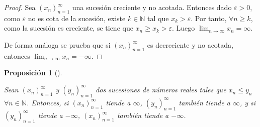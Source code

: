 \documentclass[
  a4paper,
]{scrreport}
\theoremstyle{definition}
\theoremstyle{plain}
\theoremstyle{definition}
\theoremstyle{plain}
\theoremstyle{plain}
\newtheorem{proposition}{Proposición}[chapter]
\theoremstyle{remark}
\begin{document}
\begin{tcolorbox}[enhanced jigsaw, breakable, arc=.35mm, colbacktitle=quarto-callout-note-color!10!white, toptitle=1mm, opacityback=0, colframe=quarto-callout-note-color-frame, colback=white, left=2mm, bottomrule=.15mm, opacitybacktitle=0.6, title=\textcolor{quarto-callout-note-color}{\faInfo}\hspace{0.5em}{Demostración}, toprule=.15mm, titlerule=0mm, coltitle=black, rightrule=.15mm, bottomtitle=1mm, leftrule=.75mm]

\begin{proof}

Sea \((x_n)_{n=1}^\infty\) una sucesión creciente y no acotada. Entonces
dado \(\varepsilon>0\), como \(\varepsilon\) no es cota de la sucesión,
existe \(k\in\mathbb{N}\) tal que \(x_k>\varepsilon\). Por tanto,
\(\forall n\geq k\), como la sucesión es creciente, se tiene que
\(x_n\geq x_k>\varepsilon\). Luego \(\lim_{n\to\infty}x_n=\infty\).

De forma análoga se prueba que si \((x_n)_{n=1}^\infty\) es decreciente
y no acotada, entonces \(\lim_{n\to\infty}x_n=-\infty\).

\end{proof}

\end{tcolorbox}

\leavevmode{}%
\begin{proposition}[]\label{prp-sucesiones-propiamentes-divergentes}

Sean \((x_n)_{n=1}^\infty\) y \((y_n)_{n=1}^\infty\) dos sucesiones de
números reales tales que \(x_n\leq y_n\) \(\forall n\in\mathbb{N}\).
Entonces, si \((x_n)_{n=1}^\infty\) tiende a \(\infty\),
\((y_n)_{n=1}^\infty\) también tiende a \(\infty\), y si
\((y_n)_{n=1}^\infty\) tiende a \(-\infty\), \((x_n)_{n=1}^\infty\)
también tiende a \(-\infty\).

\end{proposition}
\end{document}
